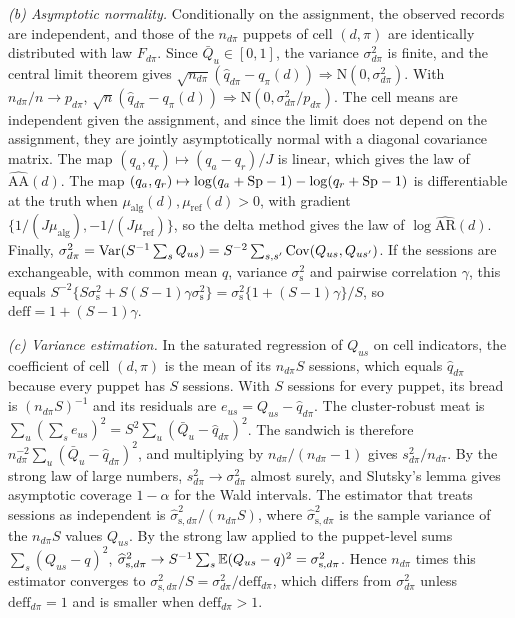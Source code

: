 \emph{(b) Asymptotic normality.} Conditionally on the assignment, the observed records are independent, and those of the $n_{d\pi}$ puppets of cell $(d,\pi)$ are identically distributed with law $F_{d\pi}$. Since $\bar Q_u\in[0,1]$, the variance $\sigma^2_{d\pi}$ is finite, and the central limit theorem gives $\sqrt{n_{d\pi}}(\widehat q_{d\pi}-q_\pi(d))\Rightarrow\mathrm N(0,\sigma^2_{d\pi})$. With $n_{d\pi}/n\to p_{d\pi}$, $\sqrt n(\widehat q_{d\pi}-q_\pi(d))\Rightarrow\mathrm N(0,\sigma^2_{d\pi}/p_{d\pi})$. The cell means are independent given the assignment, and since the limit does not depend on the assignment, they are jointly asymptotically normal with a diagonal covariance matrix. The map $(q_a,q_r)\mapsto(q_a-q_r)/J$ is linear, which gives the law of $\widehat{\mathrm{AA}}(d)$. The map $(q_a,q_r)\mapsto\log(q_a+\mathrm{Sp}-1)-\log(q_r+\mathrm{Sp}-1)$ is differentiable at the truth when $\mu_{\mathrm{alg}}(d),\mu_{\mathrm{ref}}(d)>0$, with gradient $\{1/(J\mu_{\mathrm{alg}}),-1/(J\mu_{\mathrm{ref}})\}$, so the delta method \citep[Ch.~3]{vandervaart1998} gives the law of $\log\widehat{\mathrm{AR}}(d)$. Finally, $\sigma^2_{d\pi}=\operatorname{Var}(S^{-1}\sum_sQ_{us})=S^{-2}\sum_{s,s'}\operatorname{Cov}(Q_{us},Q_{us'})$. If the sessions are exchangeable, with common mean $q$, variance $\sigma^2_{\mathrm s}$ and pairwise correlation $\gamma$, this equals $S^{-2}\{S\sigma^2_{\mathrm s}+S(S-1)\gamma\sigma^2_{\mathrm s}\}=\sigma^2_{\mathrm s}\{1+(S-1)\gamma\}/S$, so $\mathrm{deff}=1+(S-1)\gamma$.

\emph{(c) Variance estimation.} In the saturated regression of $Q_{us}$ on cell indicators, the coefficient of cell $(d,\pi)$ is the mean of its $n_{d\pi}S$ sessions, which equals $\widehat q_{d\pi}$ because every puppet has $S$ sessions. With $S$ sessions for every puppet, its bread is $(n_{d\pi}S)^{-1}$ and its residuals are $e_{us}=Q_{us}-\widehat q_{d\pi}$. The cluster-robust meat is $\sum_u(\sum_se_{us})^2=S^2\sum_u(\bar Q_u-\widehat q_{d\pi})^2$. The sandwich is therefore $n_{d\pi}^{-2}\sum_u(\bar Q_u-\widehat q_{d\pi})^2$, and multiplying by $n_{d\pi}/(n_{d\pi}-1)$ gives $s^2_{d\pi}/n_{d\pi}$. By the strong law of large numbers, $s^2_{d\pi}\to\sigma^2_{d\pi}$ almost surely, and Slutsky's lemma gives asymptotic coverage $1-\alpha$ for the Wald intervals. The estimator that treats sessions as independent is $\widehat\sigma^2_{\mathrm s,d\pi}/(n_{d\pi}S)$, where $\widehat\sigma^2_{\mathrm s,d\pi}$ is the sample variance of the $n_{d\pi}S$ values $Q_{us}$. By the strong law applied to the puppet-level sums $\sum_s(Q_{us}-q)^2$, $\widehat\sigma^2_{\mathrm s,d\pi}\to S^{-1}\sum_s\mathbb{E}(Q_{us}-q)^2=\sigma^2_{\mathrm s,d\pi}$. Hence $n_{d\pi}$ times this estimator converges to $\sigma^2_{\mathrm s,d\pi}/S=\sigma^2_{d\pi}/\mathrm{deff}_{d\pi}$, which differs from $\sigma^2_{d\pi}$ unless $\mathrm{deff}_{d\pi}=1$ and is smaller when $\mathrm{deff}_{d\pi}>1$.

